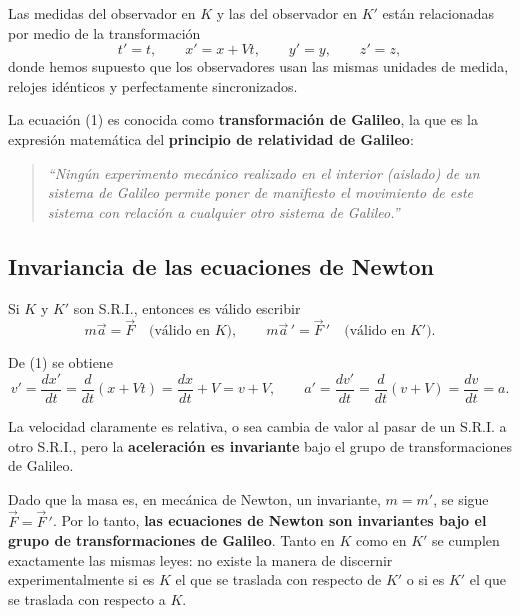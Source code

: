 \begin{definicion}
Las medidas del observador en $K$ y las del observador en $K'$ están
relacionadas por medio de la transformación
\begin{equation}
t' = t, \qquad x' = x+Vt, \qquad y'=y, \qquad z'=z, \tag{1}
\end{equation}
donde hemos supuesto que los observadores usan las mismas unidades de
medida, relojes idénticos y perfectamente sincronizados.
\end{definicion}

La ecuación (1) es conocida como \textbf{transformación de Galileo}, la
que es la expresión matemática del \textbf{principio de relatividad de
Galileo}:

\begin{quote}
\emph{``Ningún experimento mecánico realizado en el interior (aislado)
de un sistema de Galileo permite poner de manifiesto el movimiento de
este sistema con relación a cualquier otro sistema de Galileo.''}
\end{quote}

\subsection{Invariancia de las ecuaciones de Newton}

Si $K$ y $K'$ son S.R.I., entonces es válido escribir
\[
m\vec a = \vec F \quad\text{(válido en $K$)}, \qquad m\vec a\,' = \vec
F\,' \quad\text{(válido en $K'$)}.
\]

\begin{proposicionc}
De (1) se obtiene
\[
v' = \frac{dx'}{dt} = \frac{d}{dt}(x+Vt) = \frac{dx}{dt}+V = v+V, \qquad
a' = \frac{dv'}{dt} = \frac{d}{dt}(v+V) = \frac{dv}{dt} = a.
\]
\end{proposicionc}

La velocidad claramente es relativa, o sea cambia de valor al pasar de
un S.R.I. a otro S.R.I., pero la \textbf{aceleración es invariante} bajo
el grupo de transformaciones de Galileo.

Dado que la masa es, en mecánica de Newton, un invariante, $m=m'$, se
sigue $\vec F=\vec F\,'$. Por lo tanto, \textbf{las ecuaciones de Newton
son invariantes bajo el grupo de transformaciones de Galileo}. Tanto en
$K$ como en $K'$ se cumplen exactamente las mismas leyes: no existe la
manera de discernir experimentalmente si es $K$ el que se traslada con
respecto de $K'$ o si es $K'$ el que se traslada con respecto a $K$.

